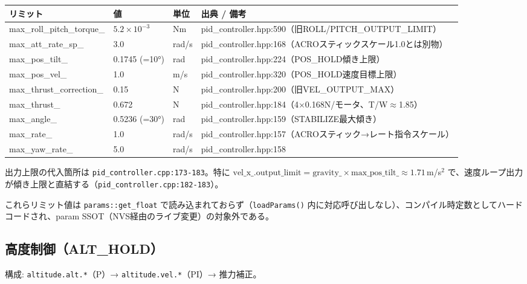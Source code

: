 \documentclass[a4paper,10pt]{ltjsarticle}
\begin{document}
\begin{table}[h]
\centering\footnotesize
\begin{tabularx}{\textwidth}{@{}lllY@{}}
\toprule
リミット & 値 & 単位 & 出典 / 備考 \\
\midrule
max\_roll\_pitch\_torque\_ & $5.2\times10^{-3}$ & Nm & pid\_controller.hpp:590（旧ROLL/PITCH\_OUTPUT\_LIMIT） \\
max\_att\_rate\_sp\_ & 3.0 & rad/s & pid\_controller.hpp:168（ACROスティックスケール1.0とは別物） \\
max\_pos\_tilt\_ & 0.1745 (=10°) & rad & pid\_controller.hpp:224（POS\_HOLD傾き上限） \\
max\_pos\_vel\_ & 1.0 & m/s & pid\_controller.hpp:320（POS\_HOLD速度目標上限） \\
max\_thrust\_correction\_ & 0.15 & N & pid\_controller.hpp:200（旧VEL\_OUTPUT\_MAX） \\
max\_thrust\_ & 0.672 & N & pid\_controller.hpp:184（4$\times$0.168N/モータ、T/W$\approx$1.85） \\
max\_angle\_ & 0.5236 (=30°) & rad & pid\_controller.hpp:159（STABILIZE最大傾き） \\
max\_rate\_ & 1.0 & rad/s & pid\_controller.hpp:157（ACROスティック→レート指令スケール） \\
max\_yaw\_rate\_ & 5.0 & rad/s & pid\_controller.hpp:158 \\
\bottomrule
\end{tabularx}
\end{table}

出力上限の代入箇所は \texttt{pid\_controller.cpp:173-183}。特に $\mathrm{vel\_x\_.output\_limit} = \mathrm{gravity\_} \times \mathrm{max\_pos\_tilt\_} \approx 1.71$\,m/s$^2$ で、速度ループ出力が傾き上限と直結する（\texttt{pid\_controller.cpp:182-183}）。

これらリミット値は \texttt{params::get\_float} で読み込まれておらず（\texttt{loadParams()} 内に対応呼び出しなし）、コンパイル時定数としてハードコードされ、param SSOT（NVS経由のライブ変更）の対象外である。

\subsection{高度制御（ALT\_HOLD）}

構成: \texttt{altitude.alt.*}（P）→ \texttt{altitude.vel.*}（PI）→ 推力補正。
\end{document}
